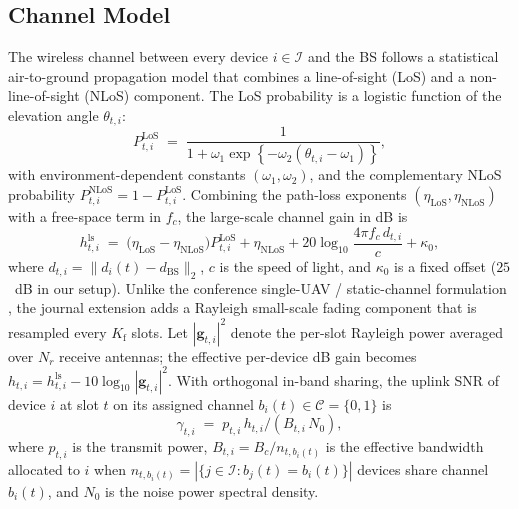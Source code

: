 \subsection{Channel Model}\label{subsec:channel}
The wireless channel between every device $i\in\mathcal{I}$ and the BS
follows a statistical air-to-ground propagation model
\cite{alhourani2014lap} that combines a line-of-sight (LoS) and a
non-line-of-sight (NLoS) component. The LoS probability is a logistic
function of the elevation angle $\theta_{t,i}$:
\begin{equation}
P^{\mathrm{LoS}}_{t,i}
\;=\; \frac{1}{1+\omega_{1}\exp\!\left\{-\omega_{2}(\theta_{t,i}-\omega_{1})\right\}},
\label{eq:plos}
\end{equation}
with environment-dependent constants $(\omega_{1},\omega_{2})$, and the
complementary NLoS probability $P^{\mathrm{NLoS}}_{t,i}=1-
P^{\mathrm{LoS}}_{t,i}$. Combining the path-loss exponents
$(\eta_{\mathrm{LoS}},\eta_{\mathrm{NLoS}})$ with a free-space term in
$f_c$, the large-scale channel gain in dB is
\begin{equation}
h^{\mathrm{ls}}_{t,i}
\;=\; \big(\eta_{\mathrm{LoS}}-\eta_{\mathrm{NLoS}}\big)P^{\mathrm{LoS}}_{t,i}
       + \eta_{\mathrm{NLoS}}
       + 20\log_{10}\!\frac{4\pi f_c\, d_{t,i}}{c} + \kappa_0,
\label{eq:hls}
\end{equation}
where $d_{t,i}=\|d_i(t)-d_{\mathrm{BS}}\|_2$, $c$ is the speed of
light, and $\kappa_0$ is a fixed offset ($25$~dB in our setup). Unlike
the conference single-UAV / static-channel formulation
\cite{liu2024jamminguav}, the journal extension adds a Rayleigh
small-scale fading component that is resampled every $K_{\mathrm{f}}$
slots. Let $|\mathbf{g}_{t,i}|^2$ denote the per-slot Rayleigh power
averaged over $N_r$ receive antennas; the effective per-device dB gain
becomes $h_{t,i}=h^{\mathrm{ls}}_{t,i}-10\log_{10}|\mathbf{g}_{t,i}|^2$.
With orthogonal in-band sharing, the uplink SNR of device $i$ at slot
$t$ on its assigned channel $b_i(t)\in\mathcal{C}=\{0,1\}$ is
\begin{equation}
\gamma_{t,i} \;=\; p_{t,i}\,h_{t,i}\big/(B_{t,i}\,N_{0}),
\label{eq:snr}
\end{equation}
where $p_{t,i}$ is the transmit power, $B_{t,i}=B_c/n_{t,b_i(t)}$ is the
effective bandwidth allocated to $i$ when $n_{t,b_i(t)}=
|\{j\in\mathcal{I}:b_j(t)=b_i(t)\}|$ devices share channel $b_i(t)$,
and $N_0$ is the noise power spectral density.

